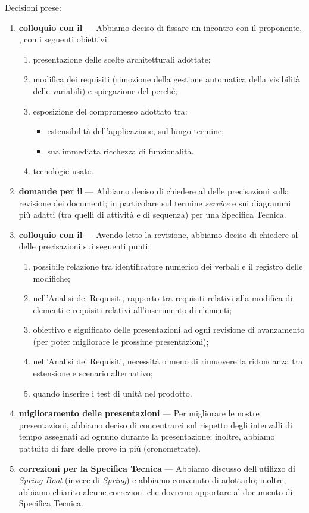 Decisioni prese:
\begin{enumerate}
	\item \textbf{colloquio con il \GP} --- Abbiamo deciso di fissare un incontro con il proponente, \GP, con i seguenti obiettivi:
	\begin{enumerate}
		\item presentazione delle scelte architetturali adottate;
		\item modifica dei requisiti (rimozione della gestione automatica della visibilità delle variabili) e spiegazione del perché;
		\item esposizione del compromesso adottato tra:
		\begin{itemize}
			\item estensibilità dell'applicazione, sul lungo termine;
			\item sua immediata ricchezza di funzionalità.
		\end{itemize}
		\item tecnologie usate.
	\end{enumerate}
	\item \textbf{domande per il \RC} --- Abbiamo deciso di chiedere al \RC{} delle precisazioni sulla revisione dei documenti; in particolare sul termine \emph{service} e sui diagrammi più adatti (tra quelli di attività e di sequenza) per una Specifica Tecnica.
	\item \textbf{colloquio con il \TV} --- Avendo letto la revisione, abbiamo deciso di chiedere al \TV{} delle precisazioni sui seguenti punti:
	\begin{enumerate}
		\item possibile relazione tra identificatore numerico dei verbali e il registro delle modifiche;
		\item nell'Analisi dei Requisiti, rapporto tra requisiti relativi alla modifica di elementi e requisiti relativi all'inserimento di elementi;
		\item obiettivo e significato delle presentazioni ad ogni revisione di avanzamento (per poter migliorare le prossime presentazioni);
		\item nell'Analisi dei Requisiti, necessità o meno di rimuovere la ridondanza tra estensione e scenario alternativo;
		\item quando inserire i test di unità nel prodotto.
	\end{enumerate}
	\item \textbf{miglioramento delle presentazioni} --- Per migliorare le nostre presentazioni, abbiamo deciso di concentrarci sul rispetto degli intervalli di tempo assegnati ad ognuno durante la presentazione; inoltre, abbiamo pattuito di fare delle prove in più (cronometrate).
	\item \textbf{correzioni per la Specifica Tecnica} --- Abbiamo discusso dell'utilizzo di \emph{Spring Boot} (invece di \emph{Spring}) e abbiamo convenuto di adottarlo; inoltre, abbiamo chiarito alcune correzioni che dovremo apportare al documento di Specifica Tecnica.
\end{enumerate}


